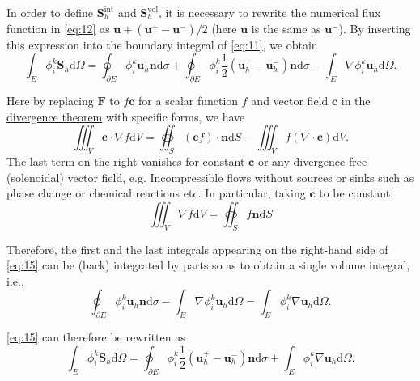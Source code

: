 \documentclass{develop-note}
\begin{document}
In order to define $\mathbf{S}_{h}^{\mathrm{int}}$ and $\mathbf{S}_{h}^{\mathrm{vol}}$, it is necessary to rewrite the numerical flux function in \autoref{eq:12} as $\mathbf{u}+(\mathbf{u}^{+}-\mathbf{u}^{-})/2$ (here $\mathbf{u}$ is the same as $\mathbf{u}^{-}$). By inserting this expression into the boundary integral of \autoref{eq:11}, we obtain
\begin{equation}
  \label{eq:15}
  \int_{E}\phi_{i}^{k}\mathbf{S}_{h}\mathrm{d}\Omega=\oint_{\partial E}\phi_{i}^{k}\mathbf{u}_{h}\mathbf{n}\mathrm{d}\sigma+\oint_{\partial E}\phi_{i}^{k}\dfrac{1}{2}(\mathbf{u}_{h}^{+}-\mathbf{u}_{h}^{-})\mathbf{n}\mathrm{d}\sigma-\int_{E}\nabla\phi_{i}^{k}\mathbf{u}_{h}\mathrm{d}\Omega.
\end{equation}

Here by replacing $\mathbf{F}$ to $f\mathbf{c}$ for a scalar function $f$ and vector field $\mathbf{c}$ in the \href{https://en.wikipedia.org/wiki/Divergence_theorem}{divergence theorem} with specific forms, we have
\begin{equation}
  \iiint_{V}\mathbf{c}\cdot\nabla f\mathrm{d}V=\oiint_{S}(\mathbf{c}f)\cdot\mathbf{n}\mathrm{d}S-\iiint_{V}f(\nabla\cdot\mathbf{c})\mathrm{d}V.
\end{equation}
The last term on the right vanishes for constant $\mathbf{c}$ or any divergence-free (solenoidal) vector field, e.g. Incompressible flows without sources or sinks such as phase change or chemical reactions etc. In particular, taking
$\mathbf{c}$ to be constant:
\begin{equation}
  \iiint_{V}\nabla f\mathrm{d}V=\oiint_{S}f\mathbf{n}\mathrm{d}S
\end{equation}

Therefore, the first and the last integrals appearing on the right-hand side of \autoref{eq:15} can be (back) integrated by parts so as to obtain a single volume integral, i.e.,
\begin{equation}
  \oint_{\partial E}\phi_{i}^{k}\mathbf{u}_{h}\mathbf{n}\mathrm{d}\sigma-\int_{E}\nabla\phi_{i}^{k}\mathbf{u}_{h}\mathrm{d}\Omega=\int_{E}\phi_{i}^{k}\nabla\mathbf{u}_{h}\mathrm{d}\Omega.
\end{equation}

\autoref{eq:15} can therefore be rewritten as
\begin{equation}
  \label{eq:18}
  \int_{E}\phi_{i}^{k}\mathbf{S}_{h}\mathrm{d}\Omega=\oint_{\partial E}\phi_{i}^{k}\dfrac{1}{2}(\mathbf{u}_{h}^{+}-\mathbf{u}_{h}^{-})\mathbf{n}\mathrm{d}\sigma+\int_{E}\phi_{i}^{k}\nabla\mathbf{u}_{h}\mathrm{d}\Omega.
\end{equation}
\end{document}
